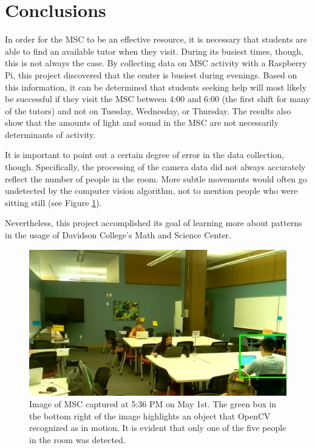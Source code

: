 
\section{Conclusions}
\label{sec:concl}

In order for the MSC to be an effective resource, it is necessary that students are able to find an available tutor when they visit. During its busiest times, though, this is not always the case. By collecting data on MSC activity with a Raspberry Pi, this project discovered that the center is busiest during evenings. Based on this information, it can be determined that students seeking help will most likely be successful if they visit the MSC between 4:00 and 6:00 (the first shift for many of the tutors) and not on Tuesday, Wednesday, or Thursday. The results also show that the amounts of light and sound in the MSC are not necessarily determinants of activity.

It is important to point out a certain degree of error in the data collection, though. Specifically, the processing of the camera data did not always accurately reflect the number of people in the room. More subtle movements would often go undetected by the computer vision algorithm, not to mention people who were sitting still (see Figure \ref{fig:cv}).

Nevertheless, this project accomplished its goal of learning more about patterns in the usage of Davidson College's Math and Science Center.

\begin{figure}[t]
    \centering
    \includegraphics[width=0.97\linewidth]{figs/18-05-01-17-36-00.jpg}
    \caption{Image of MSC captured at 5:36 PM on May 1st. The green box in the bottom right of the image highlights an object that OpenCV recognized as in motion. It is evident that only one of the five people in the room was detected.}
    \label{fig:cv}
\end{figure}


